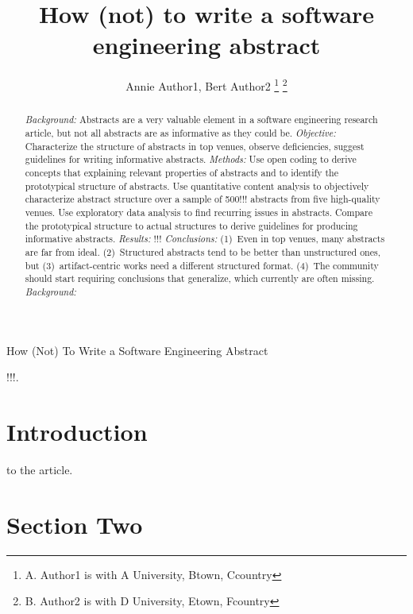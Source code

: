 \documentclass[10pt,journal,compsoc]{IEEEtran}
\begin{document}
	
\title{How (not) to write a software engineering abstract}
\author{Annie Author1, Bert Author2
\thanks{A. Author1 is with A University, Btown, Ccountry}
\thanks{B. Author2 is with D University, Etown, Fcountry}}

%
{How (Not) To Write a Software Engineering Abstract}

\maketitle

\begin{abstract}  %
\emph{Background:}
Abstracts are a very valuable element in a software engineering research article,
but not all abstracts are as informative as they could be.
\emph{Objective:} 
Characterize the structure of abstracts in top venues, 
observe deficiencies, 
suggest guidelines for writing informative abstracts.
\emph{Methods:}
Use open coding to derive concepts that explaining relevant properties of abstracts
and to identify the prototypical structure of abstracts.
Use quantitative content analysis to objectively characterize abstract structure
over a sample of 500!!! abstracts from five high-quality venues.
Use exploratory data analysis to find recurring issues in abstracts.
Compare the prototypical structure to actual structures to derive
guidelines for producing informative abstracts.
\emph{Results:}
!!!
\emph{Conclusions:}
(1)~Even in top venues, many abstracts are far from ideal.
(2)~Structured abstracts tend to be better than unstructured ones, 
but (3)~artifact-centric works need a different structured format.
(4)~The community should start requiring conclusions that generalize, 
which currently are often missing.
\emph{Background:}

\end{abstract}

\begin{IEEEkeywords}
!!!.
\end{IEEEkeywords}


\section{Introduction}
 to the article.




\section{Section Two}
\end{document}
